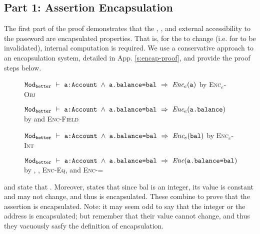 \subsection{Part 1: Assertion Encapsulation}
\label{s:BA-encap}
The first part of the proof demonstrates that the , , and external accessibility to the password are 
encapsulated properties. That is, for the  to change (i.e. for  to be invalidated), 
internal computation is required. We use a conservative approach to an encapsulation system, detailed in App. \ref{s:encap-proof}, 
and provide the proof steps below.
\\
\begin{figure}[h]
\begin{proofexample}
	{\begin{proofexample}
			{\proofstepwithrule
			{${\texttt{Mod}}_{{\texttt{better}}}\ \vdash\ {\texttt{a:Account $\wedge$ a.balance=bal}}\ \Rightarrow\ \textit{Enc$_e$}({\texttt{a}})$}
				{by \textsc{Enc$_e$-Obj}}
		}
		\endproofsteps
	\end{proofexample}
		}
	{\begin{proofexample}
		\proofsteps{\prg{balanceEnc}}
			{\proofstepwithrule
			{${\texttt{Mod}}_{{\texttt{better}}}\ \vdash\ {\texttt{a:Account $\wedge$ a.balance=bal}}\ \Rightarrow\ \textit{Enc$_e$}({\texttt{a.balance}})$}
				{by  and \textsc{Enc-Field}}
		}
		\endproofsteps
	\end{proofexample}
		}
	{\begin{proofexample}
		\proofsteps{\prg{balEnc}}
			{\proofstepwithrule
			{${\texttt{Mod}}_{{\texttt{better}}}\ \vdash\ {\texttt{a:Account $\wedge$ a.balance=bal}}\ \Rightarrow\ \textit{Enc$_e$}({\texttt{bal}})$}
				{by \textsc{Enc$_e$-Int}}
		}
		\endproofsteps
	\end{proofexample}
		}
		{\proofstepwithrule
			{
			${\texttt{Mod}}_{{\texttt{better}}}\ \vdash\ {\texttt{a:Account $\wedge$ a.balance=bal}}\ \Rightarrow\ \textit{Enc}({\texttt{a.balance=bal}})$
			}{by , , \textsc{Enc-Eq}, and \textsc{Enc-=}}}
\endproofsteps
\end{proofexample}
\end{figure}
\textbf{} and \textbf{} state that 
.
{Moreover,} \textbf{} states that since bal is an integer, {its} value is constant
and may not change, and thus is encapsulated.
These combine to prove that the assertion  is encapsulated.
Note: it may seem odd to say that the integer   { or the address
 is encapsulated};  {but remember that their value cannot change, and thus they
vacuously sasfy the definition of encapsulation.}

